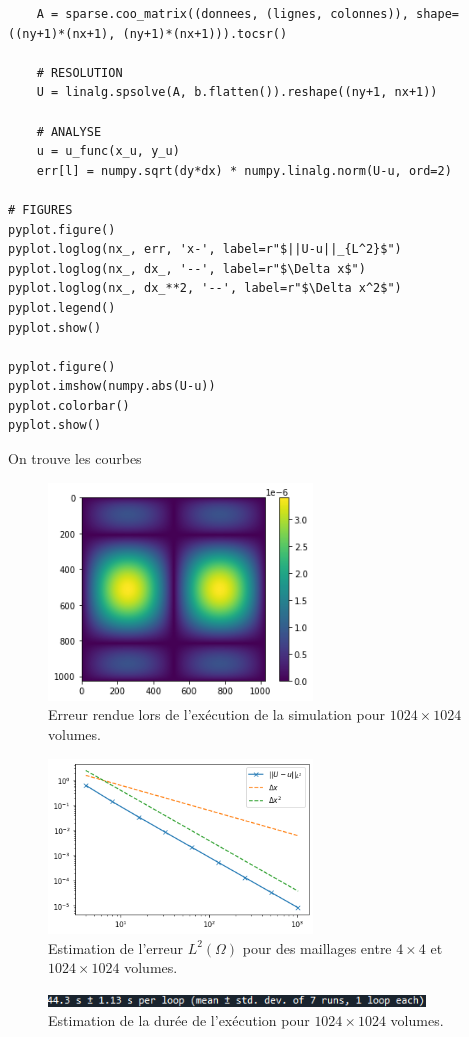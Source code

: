 \begin{verbatim}
    A = sparse.coo_matrix((donnees, (lignes, colonnes)), shape=((ny+1)*(nx+1), (ny+1)*(nx+1))).tocsr()
    
    # RESOLUTION
    U = linalg.spsolve(A, b.flatten()).reshape((ny+1, nx+1))
    
    # ANALYSE
    u = u_func(x_u, y_u)
    err[l] = numpy.sqrt(dy*dx) * numpy.linalg.norm(U-u, ord=2)
    
# FIGURES
pyplot.figure()
pyplot.loglog(nx_, err, 'x-', label=r"$||U-u||_{L^2}$")
pyplot.loglog(nx_, dx_, '--', label=r"$\Delta x$")
pyplot.loglog(nx_, dx_**2, '--', label=r"$\Delta x^2$")
pyplot.legend()
pyplot.show()

pyplot.figure()
pyplot.imshow(numpy.abs(U-u))
pyplot.colorbar()
pyplot.show()
\end{verbatim}
On trouve les courbes
\begin{figure}[htp]
    \centering
    \includegraphics[width=7cm]{Images/preliminaires/Laplace Dirichlet 2D creux/erreur.png}
    \caption{Erreur rendue lors de l'exécution de la simulation pour $1024 \times 1024$ volumes.}
    \label{fig:creuxLaplacien2DErreur}
\end{figure}
\begin{figure}[htp]
    \centering
    \includegraphics[width=7cm]{Images/preliminaires/Laplace Dirichlet 2D creux/analyse.png}
    \caption{Estimation de l'erreur $L^2(\Omega)$ pour des maillages entre $4 \times 4$ et $1024 \times 1024$ volumes.}
    \label{fig:creuxLaplacien2DAnalyse}
\end{figure}
\begin{figure}[htp]
\centering
    \includegraphics[width=10cm]{Images/preliminaires/Laplace Dirichlet 2D creux/temps.png}
    \caption{Estimation de la durée de l'exécution pour $1024 \times 1024$ volumes.}
    \label{fig:creuxLaplacienDirichlet2DTemps}
\end{figure}

